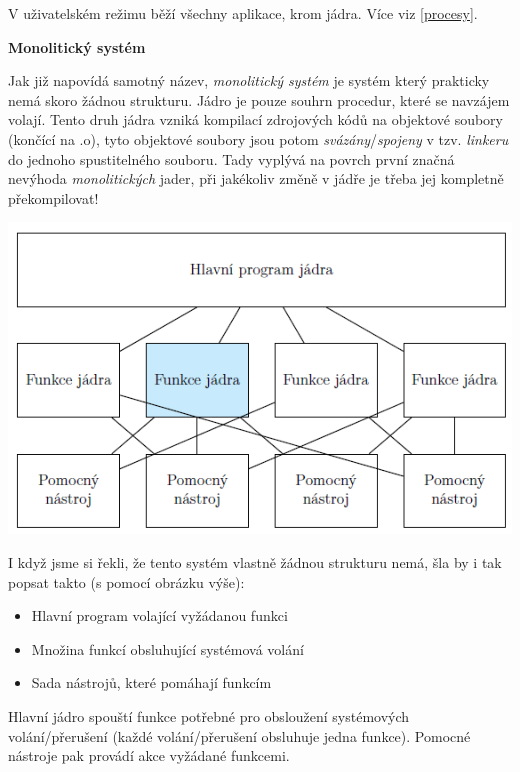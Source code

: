 V uživatelském režimu běží všechny aplikace, krom jádra. Více viz \ref{procesy}.

\begin{Large}
    \vspace{0,5cm} 
    \textbf{Monolitický systém}\\
\end{Large}

Jak již napovídá samotný název, \textit{monolitický systém} je systém který prakticky nemá skoro žádnou strukturu. Jádro je pouze souhrn procedur, které se navzájem volají. Tento druh jádra vzniká kompilací zdrojových kódů na objektové soubory (končící na .o), tyto objektové soubory jsou potom \textit{svázány}/\textit{spojeny} v tzv. \textit{linkeru} do jednoho spustitelného souboru. Tady vyplývá na povrch první značná nevýhoda \textit{monolitických} jader, při jakékoliv změně v jádře je třeba jej kompletně překompilovat! 

\begin{center}
    \includegraphics[scale=1]{images/OS_mono_kernel.png}
\end{center}

I když jsme si řekli, že tento systém vlastně žádnou strukturu nemá, šla by i tak popsat takto (s pomocí obrázku výše):

\begin{itemize}
    \item Hlavní program volající vyžádanou funkci
    \item Množina funkcí obsluhující systémová volání
    \item Sada nástrojů, které pomáhají funkcím
\end{itemize}

Hlavní jádro spouští funkce potřebné pro obsloužení systémových volání/přerušení (každé volání/přerušení obsluhuje jedna funkce). Pomocné nástroje pak provádí akce vyžádané funkcemi. 


